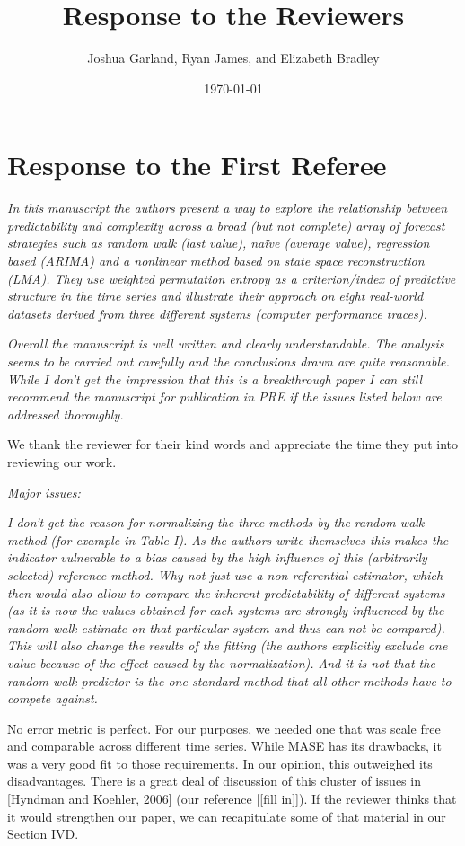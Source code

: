 \documentclass[12pt]{article}
\title{Response to the Reviewers}
\author{Joshua Garland, Ryan James, and Elizabeth Bradley}
\date{\today}
\newcommand{\alert}[1]{{\color{red}#1}}
\begin{document}
\maketitle

\section*{Response to the First Referee}

\emph{In this manuscript the authors present a way to explore the
  relationship between predictability and complexity across a broad
  (but not complete) array of forecast strategies such as random walk
  (last value), na\"ive (average value), regression based (ARIMA) and
  a nonlinear method based on state space reconstruction (LMA). They
  use weighted permutation entropy as a criterion/index of predictive
  structure in the time series and illustrate their approach on eight
  real-world datasets derived from three different systems (computer
  performance traces).}

\emph{Overall the manuscript is well written and clearly
  understandable. The analysis seems to be carried out carefully and
  the conclusions drawn are quite reasonable. While I don't get the
  impression that this is a breakthrough paper I can still recommend
  the manuscript for publication in PRE if the issues listed below are
  addressed thoroughly.}

We thank the reviewer for their kind words and appreciate the time
they put into reviewing our work.

\noindent\emph{Major issues:}

\emph{I don't get the reason for normalizing the three methods by the
  random walk method (for example in Table I). As the authors write
  themselves this makes the indicator vulnerable to a bias caused by
  the high influence of this (arbitrarily selected) reference
  method. Why not just use a non-referential estimator, which then
  would also allow to compare the inherent predictability of different
  systems (as it is now the values obtained for each systems are
  strongly influenced by the random walk estimate on that particular
  system and thus can not be compared). This will also change the
  results of the fitting (the authors explicitly exclude one value
  because of the effect caused by the normalization). And it is not
  that the random walk predictor is the one standard method that all
  other methods have to compete against.}

No error metric is perfect.  For our purposes, we needed one that was
scale free and comparable across different time series.  While MASE
has its drawbacks, it was a very good fit to those requirements.  In
our opinion, this outweighed its disadvantages.  There is a great deal
of discussion of this cluster of issues in [Hyndman and Koehler, 2006]
(our reference \alert{[[fill in]])}.  If the reviewer thinks that it
would strengthen our paper, we can recapitulate some of that material
in our Section IVD.
\end{document}

